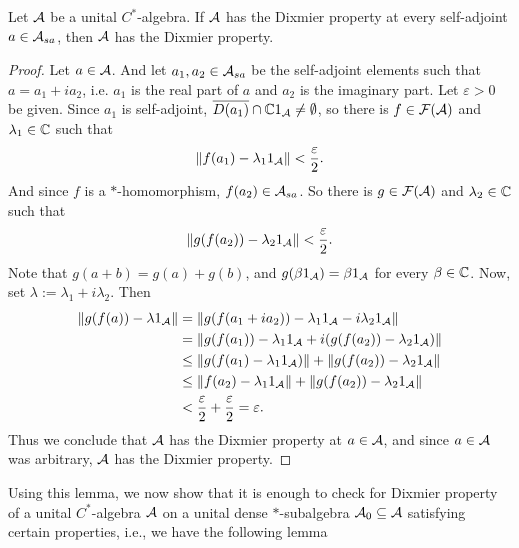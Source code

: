 \begin{lemma}\label{dixmier s-a}
Let $\mathcal{A}$ be a unital $C^*$-algebra. If $\mathcal{A}$ has the Dixmier property at every self-adjoint $a \in \mathcal{A}_{sa}$, then $\mathcal{A}$ has the Dixmier property.
\begin{proof}
Let $a \in \mathcal{A}$. And let $a_1,a_2 \in \mathcal{A}_{sa}$ be the self-adjoint elements such that $a=a_1+i a_2$, i.e. $a_1$ is the real part of $a$ and $a_2$ is the imaginary part. Let $\varepsilon>0$ be given. Since $a_1$ is self-adjoint, $\overline{D(a_1)} \cap \mathbb{C} 1_{\mathcal{A}}\neq \emptyset$, so there is $f \in \mathcal{F}(\mathcal{A})$ and $\lambda_1 \in \mathbb{C}$ such that
\begin{align*}
\lVert f(a_1) - \lambda_1 1_{\mathcal{A}} \rVert < \frac{\varepsilon}{2}.
\end{align*}
And since $f$ is a $*$-homomorphism, $f(a_2) \in \mathcal{A}_{sa}$. So there is $g \in \mathcal{F}(\mathcal{A})$ and $\lambda_2 \in \mathbb{C}$ such that
\begin{align*}
\lVert g(f(a_2))-\lambda_2 1_{\mathcal{A}} \rVert < \frac{\varepsilon}{2}.
\end{align*}
Note that $g(a+b)=g(a)+g(b)$, and $g(\beta 1_{\mathcal{A}})=\beta 1_{\mathcal{A}}$ for every $\beta \in \mathbb{C}$. Now, set $\lambda:=\lambda_1+i \lambda_2$. Then
\begin{align*}
\lVert g(f(a))-\lambda 1_{\mathcal{A}}\rVert &= \lVert g(f(a_1+ia_2))-\lambda_1 1_{\mathcal{A}}-i\lambda_2 1_{\mathcal{A}}\rVert\\
&=\lVert g(f(a_1))-\lambda_1 1_{\mathcal{A}} + i(g(f(a_2))-\lambda_2 1_{\mathcal{A}})\rVert\\
&\leq \lVert g(f(a_1)-\lambda_1 1_{\mathcal{A}})\rVert + \lVert g(f(a_2))-\lambda_2 1_{\mathcal{A}}\rVert\\
&\leq \lVert f(a_2)-\lambda_1 1_{\mathcal{A}}\rVert + \lVert g(f(a_2))-\lambda_2 1_{\mathcal{A}}\rVert\\
&< \frac{\varepsilon}{2}+\frac{\varepsilon}{2}= \varepsilon.
\end{align*}
Thus we conclude that $\mathcal{A}$ has the Dixmier property at $a \in \mathcal{A}$, and since $a \in \mathcal{A}$ was arbitrary, $\mathcal{A}$ has the Dixmier property.
\end{proof}
\end{lemma}
Using this lemma, we now show that it is enough to check for Dixmier property of a unital $C^*$-algebra $\mathcal{A}$ on a unital dense $*$-subalgebra $\mathcal{A}_0 \subseteq \mathcal{A}$ satisfying certain properties, i.e., we have the following lemma


